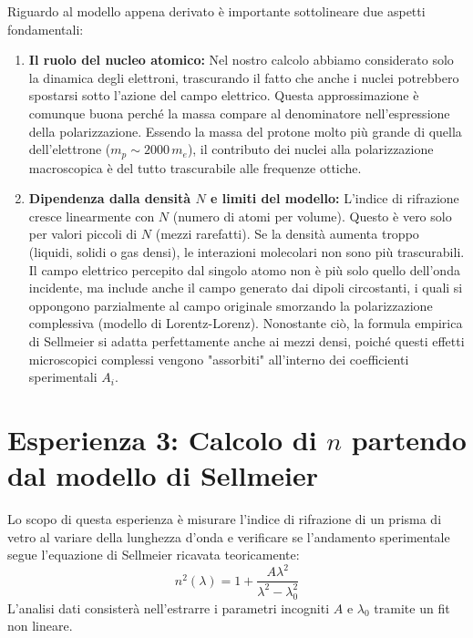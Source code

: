 \documentclass[openany,a4paper,12pt]{book}
\begin{document}
\begin{nota}[title=Considerazioni finali sul modello]
Riguardo al modello appena derivato è importante sottolineare due aspetti fondamentali:
\begin{enumerate}
    \item \textbf{Il ruolo del nucleo atomico:} Nel nostro calcolo abbiamo considerato solo la dinamica degli elettroni, trascurando il fatto che anche i nuclei potrebbero spostarsi sotto l'azione del campo elettrico. Questa approssimazione è comunque buona perché la massa compare al denominatore nell'espressione della polarizzazione. Essendo la massa del protone molto più grande di quella dell'elettrone ($m_p \sim 2000 \, m_e$), il contributo dei nuclei alla polarizzazione macroscopica è del tutto trascurabile alle frequenze ottiche.
    \item \textbf{Dipendenza dalla densità $N$ e limiti del modello:} L'indice di rifrazione cresce linearmente con $N$ (numero di atomi per volume). Questo è vero solo per valori piccoli di $N$ (mezzi rarefatti). Se la densità aumenta troppo (liquidi, solidi o gas densi), le interazioni molecolari non sono più trascurabili. Il campo elettrico percepito dal singolo atomo non è più solo quello dell'onda incidente, ma include anche il campo generato dai dipoli circostanti, i quali si oppongono parzialmente al campo originale smorzando la polarizzazione complessiva (modello di Lorentz-Lorenz). Nonostante ciò, la formula empirica di Sellmeier si adatta perfettamente anche ai mezzi densi, poiché questi effetti microscopici complessi vengono "assorbiti" all'interno dei coefficienti sperimentali $A_i$.
\end{enumerate}
\end{nota}

\section{Esperienza 3: Calcolo di $n$ partendo dal modello di Sellmeier}

Lo scopo di questa esperienza è misurare l'indice di rifrazione di un prisma di vetro al variare della lunghezza d'onda e verificare se l'andamento sperimentale segue l'equazione di Sellmeier ricavata teoricamente:
\begin{equation}
    n^2(\lambda) = 1 + \frac{A \lambda^2}{\lambda^2 - \lambda_0^2}
\end{equation}
L'analisi dati consisterà nell'estrarre i parametri incogniti $A$ e $\lambda_0$ tramite un fit non lineare.
\end{document}
